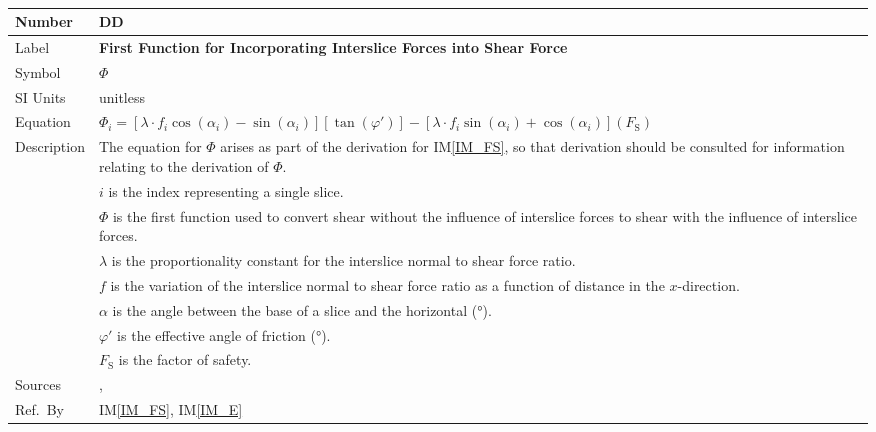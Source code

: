 \documentclass[12pt]{article}
\newcommand{\colAwidth}{0.13\textwidth}
\newcommand{\colBwidth}{0.82\textwidth}
\renewcommand{\arraystretch}{1}
\newcommand{\iref}[1]{IM\ref{#1}}
\newcounter{datadefnum} %
\newcounter{defnum} %
\begin{document}
~\newline


\noindent
\begin{minipage}{\textwidth}
	\renewcommand*{\arraystretch}{1.6}
	\begin{tabular}{| p{\colAwidth} | p{\colBwidth} |}
		
		\hline \rowcolor[gray]{0.9} Number&
		DD{datadefnum}\thedatadefnum \label{DD_Phi}\\
		
		\hline Label& \bf First Function for Incorporating Interslice Forces 
		into Shear Force\\
		\hline Symbol& $\Phi$\\
		\hline SI Units& unitless\\
		
		\hline
		Equation & 
		$\Phi_{i}= \left[ \lambda \cdot f_{i}
		\cos\left(\alpha_{i}\right) -
		\sin\left(\alpha_{i}\right) \right]\left[
		\tan\left({\varphi'}\right) \right] - \left[ \lambda
		\cdot f_{i} \sin\left(\alpha_{i}\right) +
		\cos\left(\alpha_{i}\right) \right]\left(F_\text{S}\right)$\\
		
		\hline Description &The equation for $\Phi$ arises as part of the 
		derivation for \iref{IM_FS}, so that derivation should be consulted for 
		information relating to the derivation of $\Phi$.\\
		&$i$ is the index representing a single slice.\\
		&$\Phi$ is the first function used to convert shear without the 
		influence of interslice forces to shear with the influence of 
		interslice forces.\\
		&$\lambda$ is the proportionality constant for the interslice normal to 
		shear force ratio.\\
		&$f$ is the variation of the interslice normal to shear force ratio as 
		a function of distance in the $x$-direction.\\
		&$\alpha$ is the angle between the base of a slice and the horizontal 
		(\si{\degree}).\\
		&$\varphi'$ is the effective angle of friction (\si{\degree}).\\
		&$F_\text{S}$ is the factor of safety.\\
		
		\hline Sources& \cite{ZhuEtAl2005}, \cite{Karchewski2012}\\
		
		\hline Ref.\ By & \iref{IM_FS}, \iref{IM_E}\\
		
		\hline
	\end{tabular}
\end{minipage}\\
\end{document}
